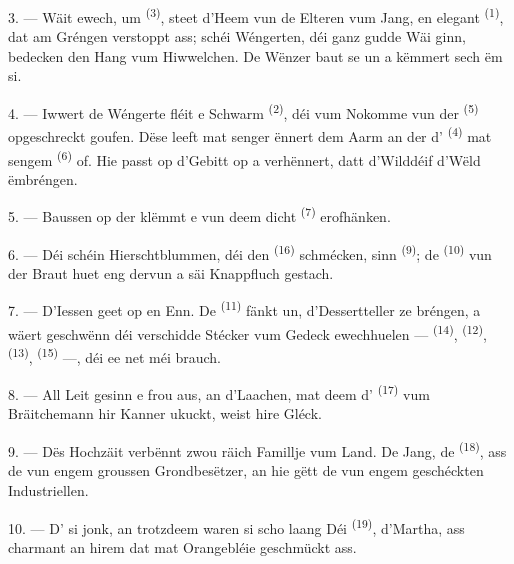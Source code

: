 3. --- Wäit ewech, um  \textsuperscript{(3)}, steet d'Heem vun de
Elteren vum Jang, en elegant  \textsuperscript{(1)}, dat am Gréngen
verstoppt ass; schéi Wéngerten, déi ganz gudde Wäi ginn, bedecken den Hang vum
Hiwwelchen. De Wënzer baut se un a këmmert sech ëm si.

4. --- Iwwert de Wéngerte fléit e Schwarm  \textsuperscript{(2)},
déi vum Nokomme vun der  \textsuperscript{(5)} opgeschreckt goufen.
Dëse leeft mat senger  ënnert dem Aarm an der  d' \textsuperscript{(4)} mat sengem 
\textsuperscript{(6)} of. Hie passt op d'Gebitt op a verhënnert, datt d'Wilddéif
d'Wëld ëmbréngen.

5. --- Baussen op der  klëmmt e  vun deem
dicht  \textsuperscript{(7)} erofhänken.

6. --- Déi schéin Hierschtblummen, déi den  \textsuperscript{(16)}
schmécken, sinn  \textsuperscript{(9)}; de 
\textsuperscript{(10)} vun der Braut huet eng dervun a säi Knappfluch gestach.

7. --- D'Iessen geet op en Enn. De  \textsuperscript{(11)} fänkt un,
d'Dessertteller ze bréngen, a wäert geschwënn déi verschidde Stécker vum Gedeck
ewechhuelen ---  \textsuperscript{(14)}, 
\textsuperscript{(12)},  \textsuperscript{(13)},
 \textsuperscript{(15)} ---, déi ee net méi brauch.

\VUsaut{3.0mm}

8. --- All Leit gesinn e frou aus, an d'Laachen, mat deem d'
\textsuperscript{(17)} vum Bräitchemann hir Kanner ukuckt, weist hire Gléck.

9. --- Dës Hochzäit verbënnt zwou räich Famillje vum Land. De Jang, de
 \textsuperscript{(18)}, ass de  vun engem groussen
Grondbesëtzer, an hie gëtt de  vun engem geschéckten
Industriellen.

10. --- D' si jonk, an trotzdeem waren si scho laang
 Déi  \textsuperscript{(19)}, d'Martha, ass
charmant an hirem  dat mat Orangebléie geschmückt ass.

